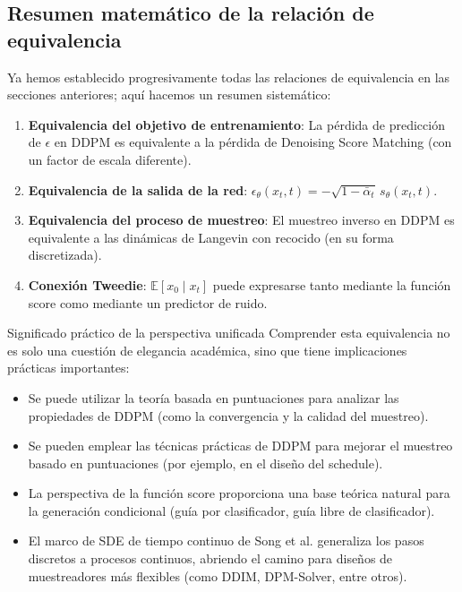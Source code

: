 \documentclass[a4paper]{article}
\begin{document}
\subsection{Resumen matemático de la relación de equivalencia}

Ya hemos establecido progresivamente todas las relaciones de equivalencia en las secciones anteriores; aquí hacemos un resumen sistemático:

\begin{enumerate}
    \item \textbf{Equivalencia del objetivo de entrenamiento}: La pérdida de predicción de $\epsilon$ en DDPM es equivalente a la pérdida de Denoising Score Matching (con un factor de escala diferente).
    \item \textbf{Equivalencia de la salida de la red}: $\epsilon_\theta(x_t, t) = -\sqrt{1-\bar{\alpha}_t}\, s_\theta(x_t, t)$.
    \item \textbf{Equivalencia del proceso de muestreo}: El muestreo inverso en DDPM es equivalente a las dinámicas de Langevin con recocido (en su forma discretizada).
    \item \textbf{Conexión Tweedie}: $\mathbb{E}[x_0 \mid x_t]$ puede expresarse tanto mediante la función score como mediante un predictor de ruido.
\end{enumerate}

\begin{importantbox}{Significado práctico de la perspectiva unificada}
Comprender esta equivalencia no es solo una cuestión de elegancia académica, sino que tiene implicaciones prácticas importantes:
\begin{itemize}
    \item Se puede utilizar la teoría basada en puntuaciones para analizar las propiedades de DDPM (como la convergencia y la calidad del muestreo).
    \item Se pueden emplear las técnicas prácticas de DDPM para mejorar el muestreo basado en puntuaciones (por ejemplo, en el diseño del schedule).
    \item La perspectiva de la función score proporciona una base teórica natural para la generación condicional (guía por clasificador, guía libre de clasificador).
    \item El marco de SDE de tiempo continuo de Song et al. generaliza los pasos discretos a procesos continuos, abriendo el camino para diseños de muestreadores más flexibles (como DDIM, DPM-Solver, entre otros).
\end{itemize}
\end{importantbox}
\end{document}
